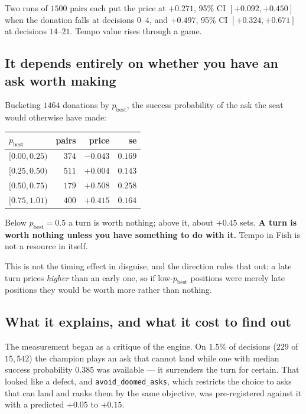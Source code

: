 \documentclass[11pt,a4paper]{article}
\begin{document}
Two runs of $1500$ pairs each put the price at $+0.271$, 95\% CI
$[+0.092, +0.450]$ when the donation falls at decisions $0$--$4$, and $+0.497$,
95\% CI $[+0.324, +0.671]$ at decisions $14$--$21$. Tempo value rises through a
game.

\subsection{It depends entirely on whether you have an ask worth making}

Bucketing $1464$ donations by $p_{\text{best}}$, the success probability of the
ask the seat would otherwise have made:

\begin{center}
\begin{tabular}{lrrr}
\toprule
$p_{\text{best}}$ & pairs & price & se \\
\midrule
$[0.00, 0.25)$ & $374$ & $-0.043$ & $0.169$ \\
$[0.25, 0.50)$ & $511$ & $+0.004$ & $0.143$ \\
$[0.50, 0.75)$ & $179$ & $\mathbf{+0.508}$ & $0.258$ \\
$[0.75, 1.01)$ & $400$ & $\mathbf{+0.415}$ & $0.164$ \\
\bottomrule
\end{tabular}
\end{center}

Below $p_{\text{best}} = 0.5$ a turn is worth nothing; above it, about $+0.45$
sets. \textbf{A turn is worth nothing unless you have something to do with it.}
Tempo in Fish is not a resource in itself.

This is not the timing effect in disguise, and the direction rules that out: a
late turn prices \emph{higher} than an early one, so if low-$p_{\text{best}}$
positions were merely late positions they would be worth more rather than
nothing.

\subsection{What it explains, and what it cost to find out}

The measurement began as a critique of the engine. On $1.5\%$ of decisions
($229$ of $15{,}542$) the champion plays an ask that cannot land while one with
median success probability $0.385$ was available --- it surrenders the turn for
certain. That looked like a defect, and \texttt{avoid\_doomed\_asks}, which
restricts the choice to asks that can land and ranks them by the same
objective, was pre-registered against it with a predicted $+0.05$ to $+0.15$.
\end{document}
